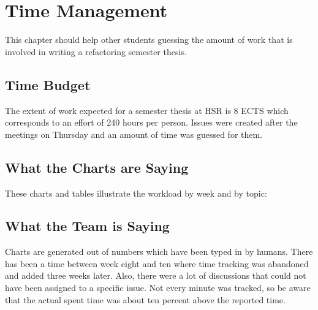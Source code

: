 \chapter{Time Management}
\thispagestyle{fancy}
This chapter should help other students guessing the amount of work that is 
involved in writing a refactoring semester thesis.

\section{Time Budget}
The extent of work expected for a semester thesis at HSR is 8 ECTS which 
corresponds to an effort of 240 hours per person. Issues were created after 
the meetings on Thursday and an amount of time was guessed for them. 

\section{What the Charts are Saying}
These charts and tables illustrate the workload by week and by topic:

\section{What the Team is Saying}
Charts are generated out of numbers which have been typed in by humans. There 
has been a time between week eight and ten where time tracking was abandoned and 
added three weeks later. Also, there were a lot of discussions that could not 
have been assigned to a specific issue. Not every minute was tracked, so be 
aware that the actual spent time was about ten percent above the reported time.
